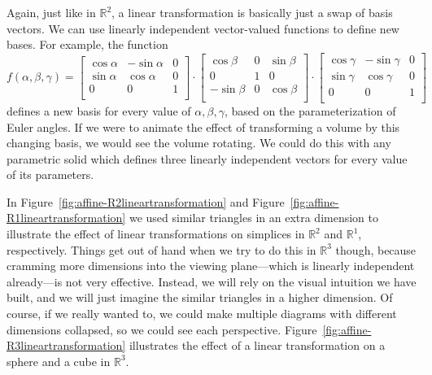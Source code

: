Again, just like in \(\mathbb{R}^{2}\), a linear transformation is 
basically just a swap of basis vectors. We can use linearly independent 
vector-valued functions to define new bases. For example, the function 
\[
    f(\alpha,\beta,\gamma)=
    \begin{bmatrix}
        \cos\alpha & -\sin\alpha & 0 \\
        \sin\alpha & \cos\alpha & 0 \\
        0 & 0 & 1 \\
    \end{bmatrix}
    \cdot
    \begin{bmatrix}
        \cos\beta & 0 & \sin\beta \\
        0 & 1 & 0 \\
        -\sin\beta & 0 & \cos\beta \\
    \end{bmatrix}
    \cdot
    \begin{bmatrix}
        \cos\gamma & -\sin\gamma & 0 \\
        \sin\gamma & \cos\gamma & 0 \\
        0 & 0 & 1 \\
    \end{bmatrix}
\]
defines a new basis for every value of \(\alpha,\beta,\gamma\), based
on the parameterization of Euler angles. If we were to animate the
effect of transforming a volume by this changing basis, we would see
the volume rotating. We could do this with any parametric solid which
defines three linearly independent vectors for every value of its
parameters.

In Figure~\ref{fig:affine-R2lineartransformation} and 
Figure~\ref{fig:affine-R1lineartransformation} we used similar triangles 
in an extra dimension to illustrate the effect of linear transformations on
simplices in \(\mathbb{R}^{2}\) and \(\mathbb{R}^{1}\), respectively. 
Things get out of hand when we try to do this in \(\mathbb{R}^{3}\) though, because
cramming more dimensions into the viewing plane---which is linearly independent already---is not very effective.
Instead, we will rely on the visual intuition we have built, and we 
will just imagine the similar triangles in a higher dimension.
Of course, if we really wanted to, we could make multiple diagrams
with different dimensions collapsed, so we could see each perspective.
Figure~\ref{fig:affine-R3lineartransformation} illustrates the effect of a linear transformation on a sphere and a cube in \(\mathbb{R}^{3}\).

